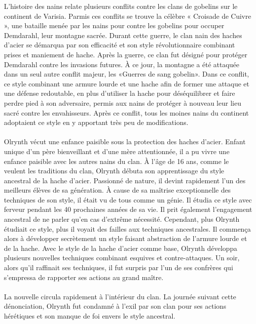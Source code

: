 \documentclass[main.tex]{subfiles}
\begin{document}
    L'histoire des nains relate plusieurs conflits contre les clans de gobelins sur le continent de Varisia.
    Parmis ces conflits se trouve la célèbre « Croisade de Cuivre », une bataille menée par les nains pour 
    contre les gobelins pour occuper Demdarahl, leur montagne sacrée. Durant cette guerre, le clan nain des 
    haches d'acier se démarqua par son efficacité et son style révolutionnaire combinant prises et maniement de
    hache. Après la guerre, ce clan fut désigné pour protéger Demdarahl contre les invasions futures. À ce 
    jour, la montagne a été attaquée dans un seul autre conflit majeur, les «Guerres de sang gobelin». Dans ce
    conflit, ce style combinant une armure lourde et une hache afin de former une attaque et une défense 
    redoutable, en plus d'utiliser la hache pour déséquilibrer et faire perdre pied à son adversaire, permis 
    aux nains de protéger à nouveau leur lieu sacré contre les envahisseurs. Après ce conflit, tous les moines 
    nains du continent adoptaient ce style en y apportant très peu de modifications. \\
    \\
    Olrynth vécut une enfance paisible sous la protection des haches d'acier.
    Enfant unique d'un père bienveillant et d'une mère attentionnée, il a pu vivre une enfance paisible avec
    les autres nains du clan. À l'âge de 16 ans, comme le veulent les traditions du clan, Olrynth débuta son
    apprentissage du style ancestral de la hache d'acier. Passionné de nature, il devint rapidement l'un des
    meilleurs élèves de sa génération. À cause de sa maîtrise exceptionnelle des techniques de son style, il
    était vu de tous comme un génie. Il étudia ce style avec ferveur pendant les 40 prochaines années de sa vie.
    Il prit également l'engagement ancestral de ne parler qu'en cas d'extrême nécessité.
    Cependant, plus Olrynth étudiait ce style, plus il voyait des failles aux techniques ancestrales. 
    Il commença alors à développer secrètement un style faisant abstraction de l'armure lourde et de la hache. 
    Avec le style de la hache d'acier comme base, Olrynth développa plusieurs nouvelles techniques combinant 
    esquives et contre-attaques. Un soir, alors qu'il raffinait ses techniques, il fut surpris par l'un de ses 
    confrères qui s'empressa de rapporter ses actions au grand maître.\\
    \\
    La nouvelle circula rapidement à l'intérieur du clan. La journée suivant cette dénonciation, Olrynth fut
    condamné à l'exil par son clan pour ses actions hérétiques et son manque de foi envers le style ancestral.
\end{document}

